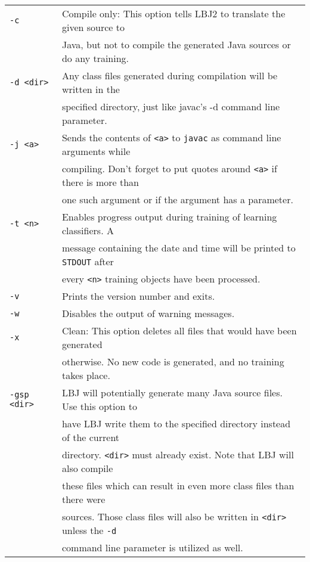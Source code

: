 \begin{center}
\begin{tabular}{ll}
{\tt -c} &
Compile only: This option tells LBJ2 to translate the given source to \\
& Java, but not to compile the generated Java sources or do any training.
\vspace{.2cm} \\

{\tt -d <dir>} &
Any class files generated during compilation will be written in the \\
& specified directory, just like javac's -d command line parameter.
\vspace{.2cm} \\

{\tt -j <a>} &
Sends the contents of {\tt <a>} to {\tt javac} as command line arguments while
\\
& compiling.  Don't forget to put quotes around {\tt <a>} if there is more
than \\
& one such argument or if the argument has a parameter. \vspace{.2cm} \\

{\tt -t <n>} &
Enables progress output during training of learning classifiers.  A \\
& message containing the date and time will be printed to {\tt STDOUT} after
\\
& every {\tt <n>} training objects have been processed. \vspace{.2cm} \\

{\tt -v} &
Prints the version number and exits. \vspace{.2cm} \\

{\tt -w} &
Disables the output of warning messages. \vspace{.2cm} \\

{\tt -x} &
Clean: This option deletes all files that would have been generated \\
& otherwise.  No new code is generated, and no training takes place.
\vspace{.2cm} \\

{\tt -gsp <dir>} &
LBJ will potentially generate many Java source files.  Use this option to \\
& have LBJ write them to the specified directory instead of the current \\
& directory.  {\tt <dir>} must already exist.  Note that LBJ will also compile
\\
& these files which can result in even more class files than there were \\
& sources.  Those class files will also be written in {\tt <dir>} unless the
{\tt -d} \\
& command line parameter is utilized as well. \vspace{.2cm} \\


\end{tabular}
\end{center}
